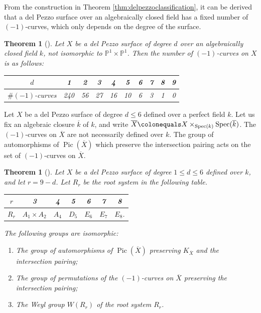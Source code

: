 \documentclass[a4paper, 11pt, reqno]{amsart}
\numberwithin{equation}{section} \numberwithin{figure}{section}
\DeclareMathOperator{\Pic}{Pic}
\DeclareMathOperator{\Spec}{Spec}
\def \P {{\mathbb P}}
\newtheorem{theorem}[lemma]{Theorem}
\theoremstyle{definition}
\numberwithin{lemma}{section}
\begin{document}
From the construction in Theorem \ref{thm:delpezzoclassification}, it can be derived that a del Pezzo surface over an algebraically closed field has a fixed number of $(-1)$-curves, which only depends on the degree of the surface.

\begin{theorem}[{\cite[Theorem 26.2(iii)]{manin}}]
    Let $X$ be a del Pezzo surface of degree $d$ over an algebraically closed field $k$, not isomorphic to $\P^1 \times \P^1$. Then the number of $(-1)$-curves on $X$ is as follows:
    \begin{table}[h]
    \centering
    \begin{tabular}{c|c c c c c c c c c}
        $d$& 1 & 2 & 3 & 4 & 5 & 6 & 7 & 8 & 9\\
        \hline
        $\# (-1)$-curves & 240 & 56 & 27 & 16 & 10 & 6 & 3 & 1 & 0
    \end{tabular}
    \label{tab:numberofexceptionalclasses}
\end{table}
\end{theorem}

Let $X$ be a del Pezzo surface of degree $d \leq 6$ defined over a perfect field $k$. Let us fix an algebraic closure $\overline{k}$ of $k$, and write $\overline{X} \colonequals X \times_{\Spec(k)} \Spec(\overline{k})$. The $(-1)$-curves on $\overline{X}$ are not necessarily defined over $k$. The group of automorphisms of $\Pic(\overline{X})$ which preserve the intersection pairing acts on the set of $(-1)$-curves on $\overline{X}$. 

\begin{theorem}[{\cite[Theorem 23.9]{manin}}] \label{thm:manin23.9}
    Let $X$ be a del Pezzo surface of degree $1 \leq d \leq 6$ defined over $k$, and let $r = 9 - d$. Let $R_r$ be the root system in the following table.
    
    \begin{table}[h]
    \centering
    \begin{tabular}{c|c c c c c c}
        $r$ & 3 & 4 & 5 & 6 & 7 & 8\\
        \hline
        $R_r$ & $A_1 \times A_2$ & $A_4$ & $D_5$ & $E_6$ & $E_7$ & $E_8$.
    \end{tabular}
    \label{tab:rootsystems}
    \end{table}
    
    The following groups are isomorphic:
    \begin{enumerate}
        \item The group of automorphisms of $\Pic(\overline{X})$ preserving $K_{\overline{X}}$ and the intersection pairing;
        \item The group of permutations of the $(-1)$-curves on $\overline{X}$ preserving the intersection pairing;
        \item The Weyl group $W(R_r)$ of the root system $R_r$.
    \end{enumerate}
\end{theorem}
\end{document}
